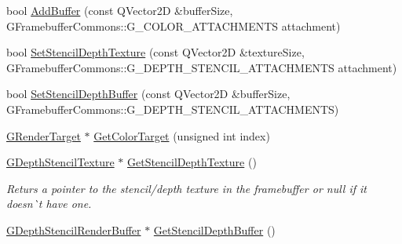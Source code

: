 \begin{DoxyCompactItemize}
\item 
bool \mbox{\hyperlink{class_geometry_engine_1_1_geometry_buffer_1_1_g_framebuffer_object_adfb75620d155c4af37683954df4eeb4d}{Add\+Buffer}} (const Q\+Vector2D \&buffer\+Size, G\+Framebuffer\+Commons\+::\+G\+\_\+\+C\+O\+L\+O\+R\+\_\+\+A\+T\+T\+A\+C\+H\+M\+E\+N\+TS attachment)
\item 
bool \mbox{\hyperlink{class_geometry_engine_1_1_geometry_buffer_1_1_g_framebuffer_object_a91836ba52af64e57cd6a7d0f3fce118f}{Set\+Stencil\+Depth\+Texture}} (const Q\+Vector2D \&texture\+Size, G\+Framebuffer\+Commons\+::\+G\+\_\+\+D\+E\+P\+T\+H\+\_\+\+S\+T\+E\+N\+C\+I\+L\+\_\+\+A\+T\+T\+A\+C\+H\+M\+E\+N\+TS attachment)
\item 
bool \mbox{\hyperlink{class_geometry_engine_1_1_geometry_buffer_1_1_g_framebuffer_object_a52a27b64109fd6e3bfd03428454d2f05}{Set\+Stencil\+Depth\+Buffer}} (const Q\+Vector2D \&buffer\+Size, G\+Framebuffer\+Commons\+::\+G\+\_\+\+D\+E\+P\+T\+H\+\_\+\+S\+T\+E\+N\+C\+I\+L\+\_\+\+A\+T\+T\+A\+C\+H\+M\+E\+N\+TS)
\item 
\mbox{\hyperlink{class_geometry_engine_1_1_geometry_buffer_1_1_g_render_target}{G\+Render\+Target}} $\ast$ \mbox{\hyperlink{class_geometry_engine_1_1_geometry_buffer_1_1_g_framebuffer_object_a340d3969c1dae0c35115ffcd2ff3772a}{Get\+Color\+Target}} (unsigned int index)
\item 
\mbox{\label{class_geometry_engine_1_1_geometry_buffer_1_1_g_framebuffer_object_a4ff07f19dba816d291467b476a3d562e}} 
\mbox{\hyperlink{class_geometry_engine_1_1_geometry_buffer_1_1_g_depth_stencil_texture}{G\+Depth\+Stencil\+Texture}} $\ast$ \mbox{\hyperlink{class_geometry_engine_1_1_geometry_buffer_1_1_g_framebuffer_object_a4ff07f19dba816d291467b476a3d562e}{Get\+Stencil\+Depth\+Texture}} ()
\begin{DoxyCompactList}\small\item\em Returs a pointer to the stencil/depth texture in the framebuffer or null if it doesn\`{}t have one. \end{DoxyCompactList}\item 
\mbox{\label{class_geometry_engine_1_1_geometry_buffer_1_1_g_framebuffer_object_a01d7e92eda01b65005b53263c271b47c}} 
\mbox{\hyperlink{class_geometry_engine_1_1_geometry_buffer_1_1_g_depth_stencil_render_buffer}{G\+Depth\+Stencil\+Render\+Buffer}} $\ast$ \mbox{\hyperlink{class_geometry_engine_1_1_geometry_buffer_1_1_g_framebuffer_object_a01d7e92eda01b65005b53263c271b47c}{Get\+Stencil\+Depth\+Buffer}} ()

\end{DoxyCompactItemize}

